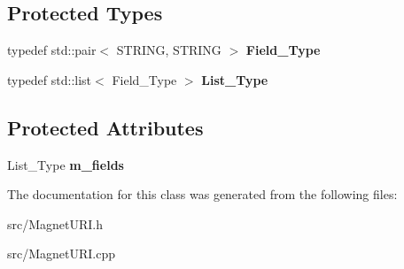 \subsection*{Protected Types}
\begin{DoxyCompactItemize}
\item 
typedef std::pair$<$ STRING, STRING $>$ {\bfseries Field\_\-Type}\label{classCMagnetURI_a141a2daa5b94dd588e252fe1293c9a7b}

\item 
typedef std::list$<$ Field\_\-Type $>$ {\bfseries List\_\-Type}\label{classCMagnetURI_aceaa162ea73c056986ada1eb81a275cd}

\end{DoxyCompactItemize}
\subsection*{Protected Attributes}
\begin{DoxyCompactItemize}
\item 
List\_\-Type {\bfseries m\_\-fields}\label{classCMagnetURI_a90883083352c8be70a5ff3d0f4225542}

\end{DoxyCompactItemize}


The documentation for this class was generated from the following files:\begin{DoxyCompactItemize}
\item 
src/MagnetURI.h\item 
src/MagnetURI.cpp\end{DoxyCompactItemize}
